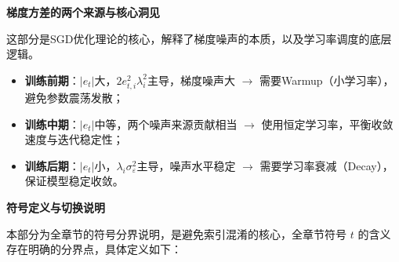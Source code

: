 \documentclass[10pt]{article}
\numberwithin{equation}{section}
\theoremstyle{plain}
\theoremstyle{definition}
\theoremstyle{remark}
\begin{document}
{\par\vspace{0.8ex}\noindent\normalsize\bfseries\color{secblue} 梯度方差的两个来源与核心洞见\par}
这部分是SGD优化理论的核心，解释了梯度噪声的本质，以及学习率调度的底层逻辑。

\begin{center}
\renewcommand{\arraystretch}{1.3}
\end{center}

\begin{SummaryBox}
\begin{itemize}[leftmargin=*,nosep]
    \item \textbf{训练前期}：$|e_t|$大，$2e_{t,i}^2\lambda_i^2$主导，梯度噪声大 $\rightarrow$ 需要Warmup（小学习率），避免参数震荡发散；
    \item \textbf{训练中期}：$|e_t|$中等，两个噪声来源贡献相当 $\rightarrow$ 使用恒定学习率，平衡收敛速度与迭代稳定性；
    \item \textbf{训练后期}：$|e_t|$小，$\lambda_i\sigma_\varepsilon^2$主导，噪声水平稳定 $\rightarrow$ 需要学习率衰减（Decay），保证模型稳定收敛。
\end{itemize}
\end{SummaryBox}

{\par\vspace{1ex}\noindent\large\bfseries\color{brandD} 符号定义与切换说明\par}\par\vspace{0.5ex}
本部分为全章节的符号分界说明，是避免索引混淆的核心，全章节符号 $t$ 的含义存在明确的分界点，具体定义如下：
\end{document}
